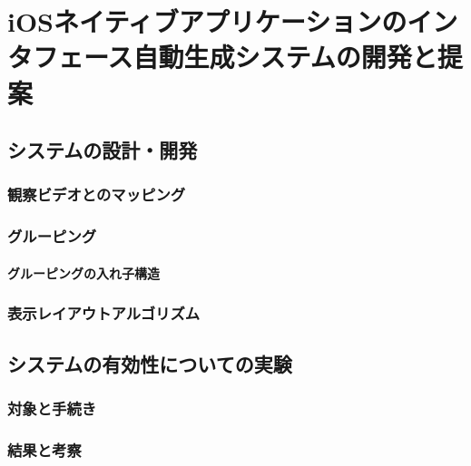 \chapter{iOSネイティブアプリケーションのインタフェース自動生成システムの開発と提案}
\label{chap:impl}

\section{システムの設計・開発}

\subsection{観察ビデオとのマッピング}

\subsection{グルーピング}
\subsubsection{グルーピングの入れ子構造}

\subsection{表示レイアウトアルゴリズム}

\section{システムの有効性についての実験}

\subsection{対象と手続き}

\subsection{結果と考察}